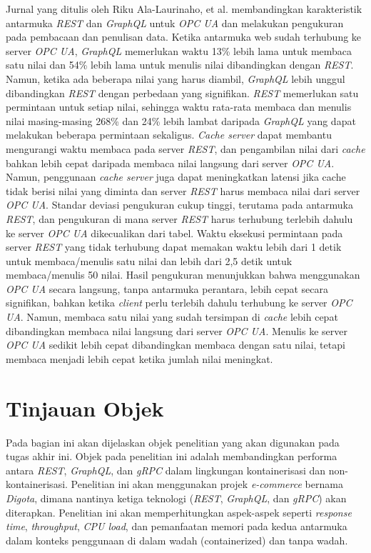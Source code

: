 Jurnal yang ditulis oleh Riku Ala-Laurinaho, et al. \cite{6} membandingkan karakteristik antarmuka \textit{REST} dan \textit{GraphQL} untuk \textit{OPC UA} dan melakukan pengukuran pada pembacaan dan penulisan data. Ketika antarmuka web sudah terhubung ke server \textit{OPC UA}, \textit{GraphQL} memerlukan waktu 13\% lebih lama untuk membaca satu nilai dan 54\% lebih lama untuk menulis nilai dibandingkan dengan \textit{REST}. Namun, ketika ada beberapa nilai yang harus diambil, \textit{GraphQL} lebih unggul dibandingkan \textit{REST} dengan perbedaan yang signifikan. \textit{REST} memerlukan satu permintaan untuk setiap nilai, sehingga waktu rata-rata membaca dan menulis nilai masing-masing 268\% dan 24\% lebih lambat daripada \textit{GraphQL} yang dapat melakukan beberapa permintaan sekaligus. \textit{Cache server} dapat membantu mengurangi waktu membaca pada server \textit{REST}, dan pengambilan nilai dari \textit{cache} bahkan lebih cepat daripada membaca nilai langsung dari server \textit{OPC UA}. Namun, penggunaan \textit{cache server} juga dapat meningkatkan latensi jika cache tidak berisi nilai yang diminta dan server \textit{REST} harus membaca nilai dari server \textit{OPC UA}. Standar deviasi pengukuran cukup tinggi, terutama pada antarmuka \textit{REST}, dan pengukuran di mana server \textit{REST} harus terhubung terlebih dahulu ke server \textit{OPC UA} dikecualikan dari tabel. Waktu eksekusi permintaan pada server \textit{REST} yang tidak terhubung dapat memakan waktu lebih dari 1 detik untuk membaca/menulis satu nilai dan lebih dari 2,5 detik untuk membaca/menulis 50 nilai. Hasil pengukuran menunjukkan bahwa menggunakan \textit{OPC UA} secara langsung, tanpa antarmuka perantara, lebih cepat secara signifikan, bahkan ketika \textit{client} perlu terlebih dahulu terhubung ke server \textit{OPC UA}. Namun, membaca satu nilai yang sudah tersimpan di \textit{cache} lebih cepat dibandingkan membaca nilai langsung dari server \textit{OPC UA}. Menulis ke server \textit{OPC UA} sedikit lebih cepat dibandingkan membaca dengan satu nilai, tetapi membaca menjadi lebih cepat ketika jumlah nilai meningkat.\\



\section{Tinjauan Objek}
Pada bagian ini akan dijelaskan objek penelitian yang akan digunakan pada tugas akhir ini. Objek pada penelitian ini adalah membandingkan performa antara \textit{REST}, \textit{GraphQL}, dan \textit{gRPC} dalam lingkungan kontainerisasi dan non-kontainerisasi. Penelitian ini akan menggunakan projek \textit{e-commerce} bernama \textit{Digota}\cite{10}, dimana nantinya ketiga teknologi (\textit{REST}, \textit{GraphQL}, dan \textit{gRPC}) akan diterapkan. Penelitian ini akan memperhitungkan aspek-aspek seperti \textit{response time}, \textit{throughput}, \textit{CPU load}, dan pemanfaatan memori pada kedua antarmuka dalam konteks penggunaan di dalam wadah (containerized) dan tanpa wadah. \\